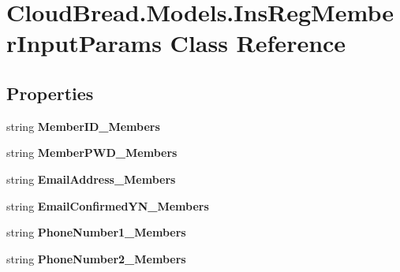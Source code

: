 \hypertarget{a00077}{}\section{Cloud\+Bread.\+Models.\+Ins\+Reg\+Member\+Input\+Params Class Reference}
\label{a00077}
\subsection*{Properties}
\begin{DoxyCompactItemize}
\item 
string {\bfseries Member\+I\+D\+\_\+\+Members}\hypertarget{a00077_a5d2ea8f32cbaabdff021345a4d4312ac}{}\label{a00077_a5d2ea8f32cbaabdff021345a4d4312ac}

\item 
string {\bfseries Member\+P\+W\+D\+\_\+\+Members}\hypertarget{a00077_a255942b53be673d1f0abe4539f363368}{}\label{a00077_a255942b53be673d1f0abe4539f363368}

\item 
string {\bfseries Email\+Address\+\_\+\+Members}\hypertarget{a00077_abba6fa03b0f75637c0a9af6bfe27600a}{}\label{a00077_abba6fa03b0f75637c0a9af6bfe27600a}

\item 
string {\bfseries Email\+Confirmed\+Y\+N\+\_\+\+Members}\hypertarget{a00077_a702380c456ae002ea4eea0bed81d4c57}{}\label{a00077_a702380c456ae002ea4eea0bed81d4c57}

\item 
string {\bfseries Phone\+Number1\+\_\+\+Members}\hypertarget{a00077_acb9819c29f32c08baca36e045b8a291f}{}\label{a00077_acb9819c29f32c08baca36e045b8a291f}

\item 
string {\bfseries Phone\+Number2\+\_\+\+Members}\hypertarget{a00077_a858c7386af52eebffe96c48d842caca9}{}\label{a00077_a858c7386af52eebffe96c48d842caca9}


\end{DoxyCompactItemize}
